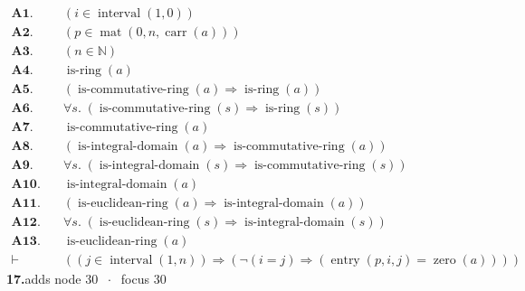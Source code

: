 \documentclass[11pt]{article}
\theoremstyle{plain}
\newcommand{\fit}[1]{\resizebox{\ifdim\width>\linewidth\linewidth\else\width\fi}{!}{#1}}
\begin{document}
\begin{align*}
  \mathbf{A1.}\quad & (i \in \operatorname{interval}(1, 0)) \\
  \mathbf{A2.}\quad & (p \in \operatorname{mat}(0, n, \operatorname{carr}(a))) \\
  \mathbf{A3.}\quad & (n \in \mathbb{N}) \\
  \mathbf{A4.}\quad & \operatorname{is\text{-}ring}(a) \\
  \mathbf{A5.}\quad & (\operatorname{is\text{-}commutative\text{-}ring}(a) \Rightarrow \operatorname{is\text{-}ring}(a)) \\
  \mathbf{A6.}\quad & \forall s.\; (\operatorname{is\text{-}commutative\text{-}ring}(s) \Rightarrow \operatorname{is\text{-}ring}(s)) \\
  \mathbf{A7.}\quad & \operatorname{is\text{-}commutative\text{-}ring}(a) \\
  \mathbf{A8.}\quad & (\operatorname{is\text{-}integral\text{-}domain}(a) \Rightarrow \operatorname{is\text{-}commutative\text{-}ring}(a)) \\
  \mathbf{A9.}\quad & \forall s.\; (\operatorname{is\text{-}integral\text{-}domain}(s) \Rightarrow \operatorname{is\text{-}commutative\text{-}ring}(s)) \\
  \mathbf{A10.}\quad & \operatorname{is\text{-}integral\text{-}domain}(a) \\
  \mathbf{A11.}\quad & (\operatorname{is\text{-}euclidean\text{-}ring}(a) \Rightarrow \operatorname{is\text{-}integral\text{-}domain}(a)) \\
  \mathbf{A12.}\quad & \forall s.\; (\operatorname{is\text{-}euclidean\text{-}ring}(s) \Rightarrow \operatorname{is\text{-}integral\text{-}domain}(s)) \\
  \mathbf{A13.}\quad & \operatorname{is\text{-}euclidean\text{-}ring}(a) \\
  \vdash\quad & ((j \in \operatorname{interval}(1, n)) \Rightarrow (\neg (i = j) \Rightarrow (\operatorname{entry}(p, i, j) = \operatorname{zero}(a))))
\end{align*}
\medskip\noindent\textbf{17.}\quad \fit{\texttt{(di)}}\hfill{\small adds node 30 $\;\cdot\;$ focus 30}\\[2pt]
\end{document}
